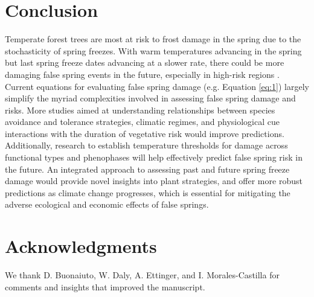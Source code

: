 \documentclass{article}\usepackage[]{graphicx}\usepackage[]{color}
\begin{document}

\section*{Conclusion}
Temperate forest trees are most at risk to frost damage in the spring due to the stochasticity of spring freezes. With warm temperatures advancing in the spring but last spring freeze dates advancing at a slower rate, there could be more damaging false spring events in the future, especially in high-risk regions \citep{Gu2008, Inouye2008, Liu2018}. Current equations for evaluating false spring damage (e.g. Equation \ref{eq:1}) largely simplify the myriad complexities involved in assessing false spring damage and risks. More studies aimed at understanding relationships between species avoidance and tolerance strategies, climatic regimes, and physiological cue interactions with the duration of vegetative risk would improve predictions. Additionally, research to establish temperature thresholds for damage across functional types and phenophases will help effectively predict false spring risk in the future. An integrated approach to assessing past and future spring freeze damage would provide novel insights into plant strategies, and offer more robust predictions as climate change progresses, which is essential for mitigating the adverse ecological and economic effects of false springs.

\section*{Acknowledgments}
We thank D. Buonaiuto,  W. Daly, A. Ettinger, and I. Morales-Castilla for comments and insights that improved the manuscript. 

\nocite{Soudani2012}
\nocite{White2009}
\nocite{Schaber2005}
\nocite{Schwartz1993}
\nocite{Barker2005}
\nocite{Sanchez2013}
\nocite{Longstroth2012}
\nocite{Barlow2015}
\nocite{Longstroth2013}
\nocite{Charrier2011}

\end{document}
